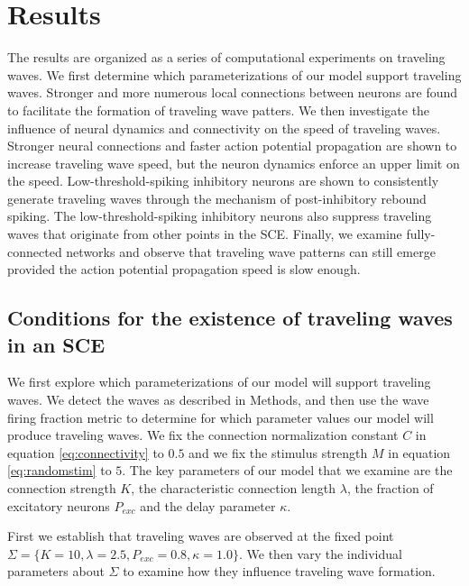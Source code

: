\documentclass[12pt]{article}
\begin{document}
\section{Results}
The results are organized as a series of computational experiments on traveling waves.
We first determine which parameterizations of our model support traveling waves.
Stronger and more numerous local connections between neurons are found to facilitate the formation of traveling wave patters.
We then investigate the influence of neural dynamics and connectivity on the speed of traveling waves.
Stronger neural connections and faster action potential propagation are shown to increase traveling wave speed, but the neuron dynamics enforce an upper limit on the speed. 
Low-threshold-spiking inhibitory neurons are shown to consistently generate traveling waves through the mechanism of post-inhibitory rebound spiking.
The low-threshold-spiking inhibitory neurons also suppress traveling waves that originate from other points in the SCE.
Finally, we examine fully-connected networks and observe that traveling wave patterns can still emerge provided the action potential propagation speed is slow enough.

\subsection{Conditions for the existence of traveling waves in an SCE} \label{sub:waves}
We first explore which parameterizations of our model will support traveling waves.
We detect the waves as described in Methods, and then use the wave firing fraction metric to determine for which parameter values our model will produce traveling waves.
We fix the connection normalization constant $C$ in equation \ref{eq:connectivity} to $0.5$ and we fix the stimulus strength $M$ in equation \ref{eq:randomstim} to $5$.
The key parameters of our model that we examine are the connection strength $K$, the characteristic connection length $\lambda$, the fraction of excitatory neurons $P_{exc}$ and the delay parameter $\kappa$.

First we establish that traveling waves are observed at the fixed point $\Sigma = \{K=10,\lambda=2.5,P_{exc}=0.8,\kappa=1.0 \}$.
We then vary the individual parameters about $\Sigma$ to examine how they influence traveling wave formation.
\end{document}
